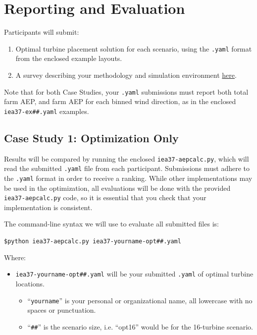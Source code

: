 \documentclass[10pt]{article}
\begin{document}
\section{Reporting and Evaluation}

    Participants will submit:
    \begin{enumerate}
        \item Optimal turbine placement solution for each scenario, using the \texttt{.yaml} format from the enclosed example layouts. 
        \item A survey describing your methodology and simulation environment \href{https://goo.gl/forms/2tX3eJ0rlnElmTgR2}{here}.
    \end{enumerate}

    Note that for both Case Studies, your \texttt{.yaml} submissions must report both total farm AEP, and farm AEP for each binned wind direction, as in the enclosed \texttt{iea37-ex\#\#.yaml} examples.

    \subsection{Case Study 1: Optimization Only}

        Results will be compared by running the enclosed \texttt{iea37-aepcalc.py}, which will read the submitted \texttt{.yaml} file from each participant.
        Submissions must adhere to the \texttt{.yaml} format in order to receive a ranking.
        While other implementations may be used in the optimization, all evaluations will be done with the provided \texttt{iea37-aepcalc.py} code, so it is essential that you check that your implementation is consistent.

        The command-line syntax we will use to evaluate all submitted files is:
        
        \vspace{0.5em}
        \texttt{\$python iea37-aepcalc.py iea37-yourname-opt\#\#.yaml}
        \vspace{0.5em}
        
        \noindent Where: 
        \begin{itemize}
            \item \texttt{iea37-yourname-opt\#\#.yaml} will be your submitted \texttt{.yaml} of optimal turbine locations.
            \begin{itemize}
                \item ``\texttt{yourname}'' is your personal or organizational name, all lowercase with no spaces or punctuation.
                \item ``\texttt{\#\#}'' is the scenario size, i.e. ``opt16'' would be for the 16-turbine scenario.
            \end{itemize}
        \end{itemize}
\end{document}
